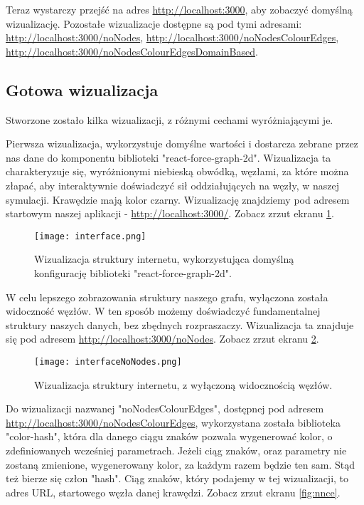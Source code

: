 \documentclass[a4paper, 12pt]{article}
\begin{document}
Teraz wystarczy przejść na adres \url{http://localhost:3000}, aby zobaczyć domyślną wizualizację.
Pozostałe wizualizacje dostępne są pod tymi adresami: \url{http://localhost:3000/noNodes}, \url{http://localhost:3000/noNodesColourEdges}, \url{http://localhost:3000/noNodesColourEdgesDomainBased}.

\subsection{Gotowa wizualizacja}

Stworzone zostało kilka wizualizacji, z różnymi cechami wyróżniającymi je.

Pierwsza wizualizacja, wykorzystuje domyślne wartości i dostarcza zebrane przez nas dane do komponentu biblioteki "react-force-graph-2d". Wizualizacja ta charakteryzuje się, wyróżnionymi niebieską obwódką, węzłami, za które można złapać, aby interaktywnie doświadczyć sił oddziałujących na węzły, w naszej symulacji. Krawędzie mają kolor czarny. Wizualizację znajdziemy pod adresem startowym naszej aplikacji - \url{http://localhost:3000/}. Zobacz zrzut ekranu \ref{fig:default}.
\begin{figure}[H]
	\centering
	\texttt{[image: interface.png]}
	\caption{Wizualizacja struktury internetu, wykorzystująca domyślną konfigurację biblioteki "react-force-graph-2d".}
	\label{fig:default}
\end{figure}

W celu lepszego zobrazowania struktury naszego grafu, wyłączona została widoczność węzłów. W ten sposób możemy doświadczyć fundamentalnej struktury naszych danych, bez zbędnych rozpraszaczy. Wizualizacja ta znajduje się pod adresem \url{http://localhost:3000/noNodes}. Zobacz zrzut ekranu \ref{fig:nn}.

\begin{figure}[H]
	\centering
	\texttt{[image: interfaceNoNodes.png]}
	\caption{Wizualizacja struktury internetu, z wyłączoną widocznością węzłów.}
	\label{fig:nn}
\end{figure}

Do wizualizacji nazwanej "noNodesColourEdges", dostępnej pod adresem \url{http://localhost:3000/noNodesColourEdges}, wykorzystana została biblioteka "color-hash", która dla danego ciągu znaków pozwala wygenerować kolor, o zdefiniowanych wcześniej parametrach. Jeżeli ciąg znaków, oraz parametry nie zostaną zmienione, wygenerowany kolor, za każdym razem będzie ten sam. Stąd też bierze się człon "hash".
Ciąg znaków, który podajemy w tej wizualizacji, to adres URL, startowego węzła danej krawędzi. Zobacz zrzut ekranu \ref{fig:nnce}.
\end{document}
